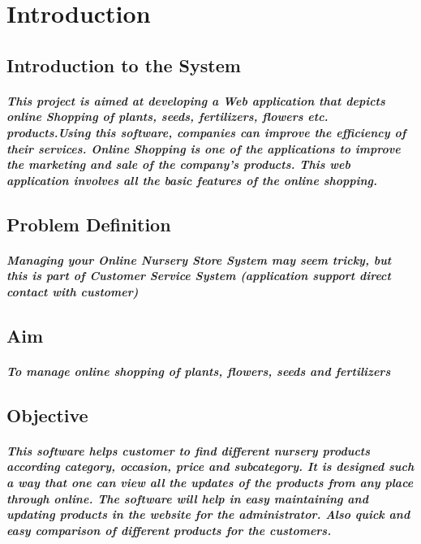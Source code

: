 \documentclass[12pt,a4paper]{report}
\begin{document}
		\pagebreak
		\tableofcontents
		\chapter{Introduction}
		\section{Introduction to the System}
		\paragraph{
			This project is aimed at developing a Web application that depicts online Shopping of plants, seeds, fertilizers, flowers etc. products.Using this software, companies can improve the efficiency of their services. Online Shopping is one of the applications to improve the marketing and sale of the company’s products. This web application involves all the basic features of the online shopping.
		}
		\section{Problem Definition}
		\paragraph
		{
			Managing your Online Nursery Store System may seem tricky, but this is part of Customer Service System (application support direct contact with customer)
		}
		\section{Aim}
		\paragraph
		{
			To manage online shopping of plants, flowers, seeds and fertilizers
		}
		\section{Objective}
		\paragraph
		{
			This software helps customer to find different nursery products according category, occasion, price and subcategory. It is designed such a way that one can view all the updates of the products from any place through online. The software will help in easy maintaining and updating products in the website for the administrator. Also quick and easy comparison of different products for the customers.
		}
										
\end{document}
